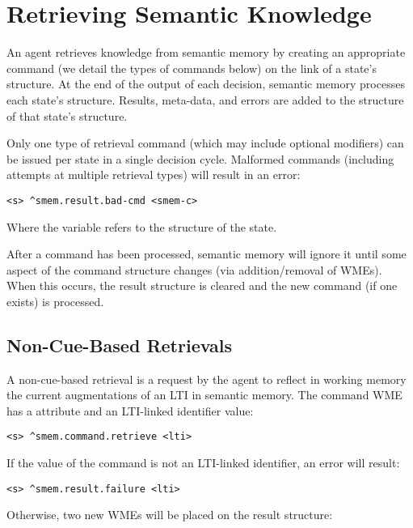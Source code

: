 \section{Retrieving Semantic Knowledge}
\label{SMEM-retrieve}

An agent retrieves knowledge from semantic memory by creating an appropriate command (we detail the types of commands below) on the  link of a state's  structure. 
At the end of the output of each decision, semantic memory processes each state's  structure.  
Results, meta-data, and errors are added to the  structure of that state's  structure.

Only one type of retrieval command (which may include optional modifiers) can be issued per state in a single decision cycle.  
Malformed commands (including attempts at multiple retrieval types) will result in an error:

\begin{verbatim}
<s> ^smem.result.bad-cmd <smem-c>
\end{verbatim}

Where the  variable refers to the  structure of the state.

After a command has been processed, semantic memory will ignore it until some aspect of the command structure changes (via addition/removal of WMEs).  
When this occurs, the result structure is cleared and the new command (if one exists) is processed.

\subsection{Non-Cue-Based Retrievals}
A non-cue-based retrieval is a request by the agent to reflect in working memory the current augmentations of an LTI in semantic memory. 
The command WME has a  attribute and an LTI-linked identifier value:

\begin{verbatim}
<s> ^smem.command.retrieve <lti>
\end{verbatim}

If the value of the command is not an LTI-linked identifier, an error will result: 

\begin{verbatim}
<s> ^smem.result.failure <lti>
\end{verbatim}

Otherwise, two new WMEs will be placed on the result structure:

